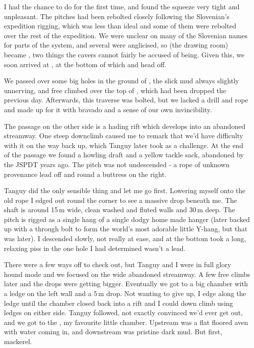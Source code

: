 I had the chance to do  for the first time, and found the squeeze very tight and unpleasant. The pitches had been rebolted closely following the Slovenian's expedition rigging, which was less than ideal and some of them were rebolted over the rest of the expedition. We were unclear on many of the Slovenian names for parts of the system, and several were anglicised, so  (the drawing room) became , two things the  cavers cannot fairly be accused of being. Given this, we soon arrived at , at the bottom of which  and  head off.
 
We passed over some big holes in the ground of , the slick mud always slightly unnerving, and free climbed over the top of , which had been dropped the previous day. Afterwards, this traverse was bolted, but we lacked a drill and rope and made up for it with bravado and a sense of our own invincibility.
 
The passage on the other side is a hading rift which develops into an abandoned streamway. One steep downclimb caused me to remark that we'd have difficulty with it on the way back up, which Tanguy later took as a challenge. At the end of the passage we found a howling draft and a yellow tackle sack, abandoned by the JSPDT years ago. The pitch was not undescended -  a rope of unknown provenance lead off and round a buttress on the right.
 
Tanguy did the only sensible thing and let me go first. Lowering myself onto the old rope I edged out round the corner to see a massive drop beneath me. The shaft is around 15\,m wide, clean washed and fluted walls and 30\,m deep. The pitch is rigged as a single hang of a single dodgy home made hanger (later backed up with a through bolt to form the world's most adorable little Y-hang, but that was later). I descended slowly, not really at ease, and at the bottom took a long, relaxing piss in the one hole I had determined wasn't a lead.
 
There were a few ways off to check out, but Tanguy and I were in full glory hound mode and we focused on the wide abandoned streamway. A few free climbs later and the drops were getting bigger. Eventually we got to a big chamber with a ledge on the left wall and a 5\,m drop. Not wanting to give up, I edge along the ledge until the chamber closed back into a rift and I could down climb using ledges on either side. Tanguy followed, not exactly convinced we'd ever get out, and we got to the , my favourite little chamber. Upstream was a flat floored aven with water coming in, and downstream was pristine dark mud. But first, mackerel.
 

